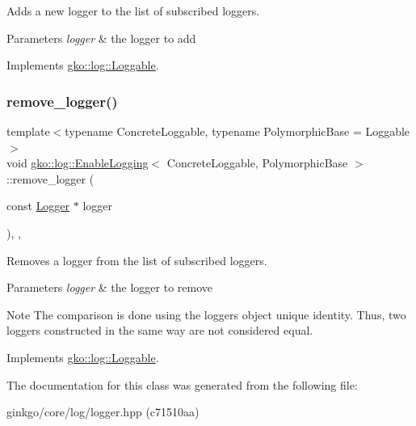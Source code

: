 Adds a new logger to the list of subscribed loggers. 


\begin{DoxyParams}{Parameters}
{\em logger} & the logger to add \\
\hline
\end{DoxyParams}


Implements \hyperlink{classgko_1_1log_1_1Loggable_aa2bb887b5ef7e75fa1a30ee1896ed932}{gko\+::log\+::\+Loggable}.

\mbox{\label{classgko_1_1log_1_1EnableLogging_aba5317f8a03956a61d770e9b07fc65cc}} 
\subsubsection{\texorpdfstring{remove\+\_\+logger()}{remove\_logger()}}
{\footnotesize\ttfamily template$<$typename Concrete\+Loggable, typename Polymorphic\+Base = Loggable$>$ \\
void \hyperlink{classgko_1_1log_1_1EnableLogging}{gko\+::log\+::\+Enable\+Logging}$<$ Concrete\+Loggable, Polymorphic\+Base $>$\+::remove\+\_\+logger (\begin{DoxyParamCaption}\item[{const \hyperlink{classgko_1_1log_1_1Logger}{Logger} $\ast$}]{logger }\end{DoxyParamCaption})\hspace{0.3cm}{\ttfamily [inline]}, {\ttfamily [override]}, {\ttfamily [virtual]}}



Removes a logger from the list of subscribed loggers. 


\begin{DoxyParams}{Parameters}
{\em logger} & the logger to remove\\
\hline
\end{DoxyParams}
\begin{DoxyNote}{Note}
The comparison is done using the logger\textquotesingle{}s object unique identity. Thus, two loggers constructed in the same way are not considered equal. 
\end{DoxyNote}


Implements \hyperlink{classgko_1_1log_1_1Loggable_a5de4092a74cf04f30f13636d49aaec8b}{gko\+::log\+::\+Loggable}.



The documentation for this class was generated from the following file\+:\begin{DoxyCompactItemize}
\item 
ginkgo/core/log/logger.\+hpp (c71510aa)\end{DoxyCompactItemize}
